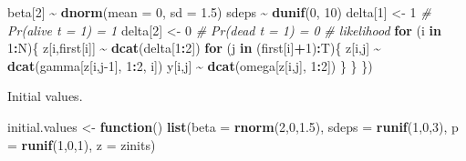 \documentclass[
  12pt,
]{krantz}
\newenvironment{Shaded}{\begin{snugshade}}{\end{snugshade}}
\newcommand{\AttributeTok}[1]{\textcolor[rgb]{0.13,0.29,0.53}{#1}}
\newcommand{\CommentTok}[1]{\textcolor[rgb]{0.56,0.35,0.01}{\textit{#1}}}
\newcommand{\ControlFlowTok}[1]{\textcolor[rgb]{0.13,0.29,0.53}{\textbf{#1}}}
\newcommand{\DecValTok}[1]{\textcolor[rgb]{0.00,0.00,0.81}{#1}}
\newcommand{\FloatTok}[1]{\textcolor[rgb]{0.00,0.00,0.81}{#1}}
\newcommand{\FunctionTok}[1]{\textcolor[rgb]{0.13,0.29,0.53}{\textbf{#1}}}
\newcommand{\NormalTok}[1]{#1}
\newcommand{\OtherTok}[1]{\textcolor[rgb]{0.56,0.35,0.01}{#1}}
\newcommand{\SpecialCharTok}[1]{\textcolor[rgb]{0.81,0.36,0.00}{\textbf{#1}}}
\begin{document}
\begin{Shaded}
\begin{Highlighting}[]
\NormalTok{  beta[}\DecValTok{2}\NormalTok{] }\SpecialCharTok{\textasciitilde{}} \FunctionTok{dnorm}\NormalTok{(}\AttributeTok{mean =} \DecValTok{0}\NormalTok{, }\AttributeTok{sd =} \FloatTok{1.5}\NormalTok{)}
\NormalTok{  sdeps }\SpecialCharTok{\textasciitilde{}} \FunctionTok{dunif}\NormalTok{(}\DecValTok{0}\NormalTok{, }\DecValTok{10}\NormalTok{)}
\NormalTok{  delta[}\DecValTok{1}\NormalTok{] }\OtherTok{\textless{}{-}} \DecValTok{1}          \CommentTok{\# Pr(alive t = 1) = 1}
\NormalTok{  delta[}\DecValTok{2}\NormalTok{] }\OtherTok{\textless{}{-}} \DecValTok{0}          \CommentTok{\# Pr(dead t = 1) = 0}
  \CommentTok{\# likelihood}
  \ControlFlowTok{for}\NormalTok{ (i }\ControlFlowTok{in} \DecValTok{1}\SpecialCharTok{:}\NormalTok{N)\{}
\NormalTok{    z[i,first[i]] }\SpecialCharTok{\textasciitilde{}} \FunctionTok{dcat}\NormalTok{(delta[}\DecValTok{1}\SpecialCharTok{:}\DecValTok{2}\NormalTok{])}
    \ControlFlowTok{for}\NormalTok{ (j }\ControlFlowTok{in}\NormalTok{ (first[i]}\SpecialCharTok{+}\DecValTok{1}\NormalTok{)}\SpecialCharTok{:}\NormalTok{T)\{}
\NormalTok{      z[i,j] }\SpecialCharTok{\textasciitilde{}} \FunctionTok{dcat}\NormalTok{(gamma[z[i,j}\DecValTok{{-}1}\NormalTok{], }\DecValTok{1}\SpecialCharTok{:}\DecValTok{2}\NormalTok{, i])}
\NormalTok{      y[i,j] }\SpecialCharTok{\textasciitilde{}} \FunctionTok{dcat}\NormalTok{(omega[z[i,j], }\DecValTok{1}\SpecialCharTok{:}\DecValTok{2}\NormalTok{])}
\NormalTok{    \}}
\NormalTok{  \}}
\NormalTok{\})}
\end{Highlighting}
\end{Shaded}

Initial values.

\begin{Shaded}
\begin{Highlighting}[]
\NormalTok{initial.values }\OtherTok{\textless{}{-}} \ControlFlowTok{function}\NormalTok{() }\FunctionTok{list}\NormalTok{(}\AttributeTok{beta =} \FunctionTok{rnorm}\NormalTok{(}\DecValTok{2}\NormalTok{,}\DecValTok{0}\NormalTok{,}\FloatTok{1.5}\NormalTok{),}
                                  \AttributeTok{sdeps =} \FunctionTok{runif}\NormalTok{(}\DecValTok{1}\NormalTok{,}\DecValTok{0}\NormalTok{,}\DecValTok{3}\NormalTok{),}
                                  \AttributeTok{p =} \FunctionTok{runif}\NormalTok{(}\DecValTok{1}\NormalTok{,}\DecValTok{0}\NormalTok{,}\DecValTok{1}\NormalTok{),}
                                  \AttributeTok{z =}\NormalTok{ zinits)}
\end{Highlighting}
\end{Shaded}
\end{document}
